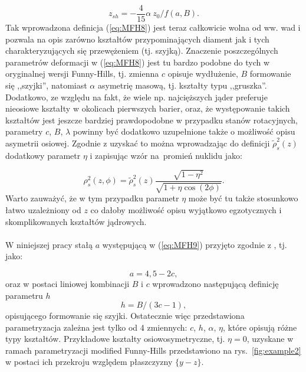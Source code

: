 \documentclass[a4paper,polish,twoside]{article}
\numberwithin{equation}{section}
\begin{document}
\begin{equation}
z_{sh}=- \frac{4}{15} \alpha ~ z_0 / f(a,B).
\end{equation}
Tak wprowadzona definicja (\ref{eq:MFH8}) jest teraz całkowicie wolna od ww. wad i pozwala na opis zarówno kształtów przypominających diament jak i tych charakteryzujących się przewężeniem (tj. szyjką). Znaczenie poszczególnych parametrów deformacji w (\ref{eq:MFH8}) jest tu bardzo podobne do tych w oryginalnej wersji Funny-Hills, tj. zmienna $c$ opisuje wydłużenie, $B$ formowanie się ,,szyjki'', natomiast $\alpha$ asymetrię masową, tj. kształty typu ,,gruszka''. Dodatkowo, ze względu na fakt, że wiele np. najcięższych jąder preferuje nieosiowe kształty w okolicach pierwszych barier, oraz, że występowanie takich kształtów jest jeszcze bardziej prawdopodobne w przypadku stanów rotacyjnych, parametry $c$, $B$, $\lambda$ powinny być dodatkowo uzupełnione także o możliwość opisu asymetrii osiowej. Zgodnie z \cite{MFH} uzyskać to można wprowadzając do definicji $\tilde{\rho}^{2}_{s}(z)$ dodatkowy parametr $\eta$ i zapisując wzór na~promień nuklidu jako:

\begin{equation}\label{eq:MFHOST}
{\rho}^{2}_{s}(z,\phi)=\tilde{\rho}^{2}_{s}(z) \frac {\sqrt{1-\eta^2}}{\sqrt{1+\eta \cos(2 \phi)}}.
\end{equation}
Warto zauważyć, że w tym przypadku parametr $\eta$ może być tu także stosunkowo łatwo uzależniony od $z$ co dałoby możliwość opisu wyjątkowo egzotycznych i skomplikowanych kształtów jądrowych. \\\\
W niniejszej pracy stałą $a$ występującą w (\ref{eq:MFH9}) przyjęto  zgodnie z \cite{POM2}, tj. jako: 

\begin{equation}
a=4,5-2c, 
\end{equation}
oraz w postaci liniowej kombinacji $B$ i $c$ wprowadzono następującą definicję parametru $h$ \cite{DOBROW}
\begin{equation}
h=B/(3c-1),
\end{equation}
opisującego formowanie się szyjki. Ostatecznie więc przedstawiona parametryzacja zależna jest tylko od 4 zmiennych: $c$, $h$, $\alpha$, $\eta$, które opisują różne typy kształtów. Przykładowe kształty osiowosymetryczne, tj. $\eta = 0$, uzyskane w ramach parametryzacji modified Funny-Hills przedstawiono na rys.~\ref{fig:example2} w postaci ich przekroju względem płaszczyzny $\{y-z\}$.
\end{document}
